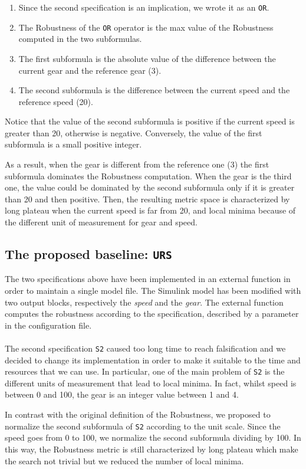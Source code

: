 \documentclass[11pt]{article}
\begin{document}
\begin{enumerate}
\item Since the second specification is an implication, we wrote it as an \texttt{OR}.
\item The Robustness of the \texttt{OR} operator is the max value of the Robustness computed in the two subformulas.
\item The first subformula is the absolute value of the difference between the current gear and the reference gear (3).
\item The second subformula is the difference between the current speed and the reference speed (20).
\end{enumerate}

Notice that the value of the second subformula is positive if the current speed is greater than 20, otherwise is negative. Conversely, the value of the first subformula is a small positive integer.

As a result, when the gear is different from the reference one (3) the first subformula dominates the Robustness computation. When the gear is the third one, the value could be dominated by     the second subformula only if it is greater than 20 and then positive. Then, the resulting metric space is characterized by long plateau when the current speed is far from 20, and local minima because of  the different unit of measurement for gear and speed.

\subsection{The proposed baseline: \texttt{URS}}
The two specifications above have been implemented in an external function in order to maintain a single model file. The Simulink model has been modified with two output blocks, respectively the \textit{speed} and the \textit{gear}. The external function computes the robustness according to the specification, described by a parameter in the configuration file.
\\ \\
The second specification \texttt{S2} caused too long time to reach falsification and we decided to change its implementation in order to make it suitable to the time and resources that we can use. In particular, one of the main problem of \texttt{S2} is the different units of measurement that lead to local minima. In fact, whilst speed is between 0 and 100, the gear is an integer value between 1 and 4.

In contrast with the original definition of the Robustness, we proposed to normalize the second subformula of \texttt{S2} according to the unit scale. Since the speed goes from 0 to 100, we normalize the second subformula dividing by 100. In this way, the Robustness metric is still characterized by long plateau which make the search not trivial but we reduced the number of local minima.
\end{document}
